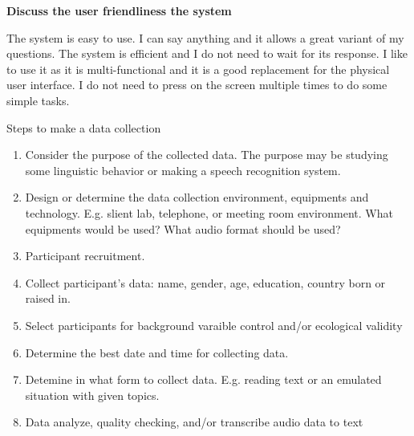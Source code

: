 \documentclass[12pt]{article}
\newenvironment{problem}[2][Problem]{\begin{trivlist}
\item[\hskip \labelsep {\bfseries #1}\hskip \labelsep {\bfseries #2.}]}{\end{trivlist}}
\begin{document}
\begin{problem}{3.3}
    \textbf{Discuss the user friendliness the system}

    The system is easy to use. 
    I can say anything and it allows a great variant of my questions. 
    The system is efficient and I do not need to wait for its response. 
    I like to use it as it is multi-functional and it is a good replacement 
    for the physical user interface. 
    I do not need to press on the screen multiple times to do some simple tasks.

\end{problem}

\pagebreak
\begin{problem}{4.1}
    Steps to make a data collection
    \begin{enumerate}
        \item Consider the purpose of the collected data. The purpose may be
        studying some linguistic behavior or making a speech recognition system.
        \item Design or determine the data collection environment, equipments and technology.
        E.g. slient lab, telephone, or meeting room environment.
        What equipments would be used? What audio format should be used?
        \item Participant recruitment.
        \item Collect participant's data: name, gender, age, education, country born or raised in.
        \item Select participants for background varaible control and/or ecological validity
        \item Determine the best date and time for collecting data.
        \item Detemine in what form to collect data.
        E.g. reading text or an emulated situation with given topics.
        \item Data analyze, quality checking, and/or transcribe audio data to text
    \end{enumerate}
\end{problem}
\end{document}
